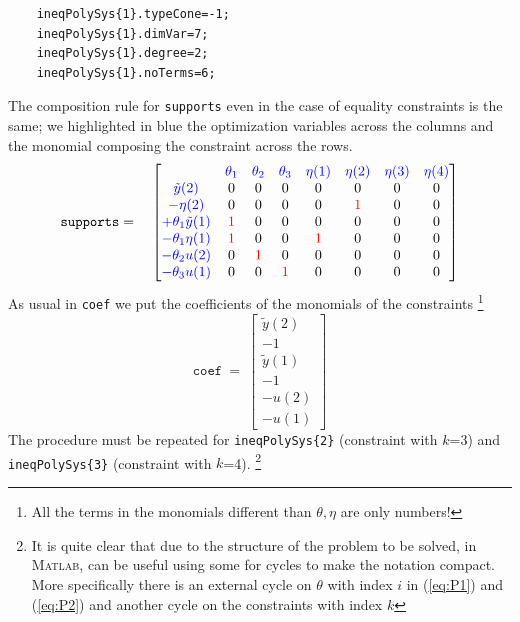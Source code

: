 \begin{verbatim}
    ineqPolySys{1}.typeCone=-1; 
    ineqPolySys{1}.dimVar=7; 
    ineqPolySys{1}.degree=2; 
    ineqPolySys{1}.noTerms=6; 
\end{verbatim}
The composition rule for \texttt{supports} even in the case of equality constraints is the same; we highlighted in {\color{blue}blue} the optimization variables across the columns and the monomial composing the constraint across the rows.
\begin{equation*}
    \texttt{supports}= 
    \quad \begin{bmatrix}
        &{\color{blue}\theta_1}&
        {\color{blue}\theta_2}&
        {\color{blue}\theta_3}&
        {\color{blue}\eta(1)}&
        {\color{blue}\eta(2)}&
        {\color{blue}\eta(3)}&
        {\color{blue}\eta(4)}\\
        {\color{blue}\tilde{y}(2)}&
        0&0&0&0&0&0&0\\
        {\color{blue}-\eta(2)}
        &0&0&0&0&{\color{red}1}&0&0\\
        {\color{blue}+ \theta_1 \tilde{y}(1)} 
        &{\color{red}1}&0&0&0&0&0&0\\
        {\color{blue}- \theta_1 \eta(1)}
        &{\color{red}1}&0&0&{\color{red}1}&0&0&0\\
        {\color{blue}-\theta_2 u(2)}
        &0&{\color{red}1}&0&0&0&0&0\\
        {\color{blue}- \theta_3 u(1)} 
        &0&0&{\color{red}1}&0&0&0&0
    \end{bmatrix}
\end{equation*}
As usual in \texttt{coef} we put the coefficients of the monomials of the constraints
\footnote[3]{All the terms in the monomials different than $\theta, \eta$ are only numbers!}
\begin{equation*}
    \texttt{coef} \ = \ \begin{bmatrix}
        \tilde{y}(2)\\
        -1\\
        \tilde{y}(1)\\
        -1\\
        -u(2)\\
        -u(1)
    \end{bmatrix}
\end{equation*}
The procedure must be repeated for \texttt{ineqPolySys\{2\}} (constraint with $k$=3) and \texttt{ineqPolySys\{3\}} (constraint with $k$=4).
\footnote[4]{It is quite clear that due to the structure of the problem to be solved, in \textsc{Matlab}, can be useful using some for cycles to make the notation compact. More specifically there is an external cycle on $\theta$ with index $i$ in (\ref{eq:P1}) and (\ref{eq:P2}) and another cycle on the constraints with index $k$}\\


